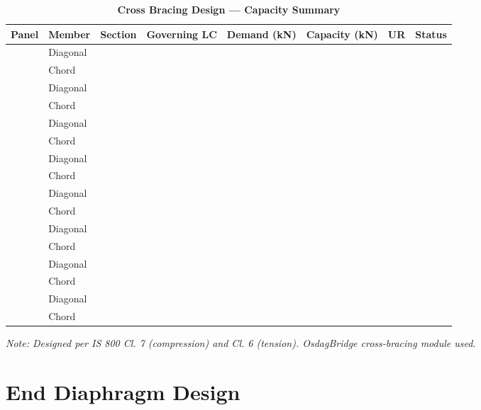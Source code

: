 \documentclass[12pt,a4paper]{report}
\numberwithin{table}{chapter}
\numberwithin{figure}{chapter}
\begin{document}
\vspace{1em}
\begin{longtable}{|C{2.0cm}|L{1.8cm}|C{2.2cm}|C{3.0cm}|C{1.8cm}|C{1.8cm}|C{1.2cm}|C{1.8cm}|}
\caption{\textbf{Cross Bracing Design --- Capacity Summary}}
\hline
\textbf{Panel} & \textbf{Member} & \textbf{Section} & \textbf{Governing LC} & \textbf{Demand (kN)} & \textbf{Capacity (kN)} & \textbf{UR} & \textbf{Status} \\[6pt]
\hline
{} & Diagonal &  &  &  &  &  &  \\[6pt]
 & Chord &  &  &  &  &  &  \\[6pt]
\hline
{} & Diagonal &  &  &  &  &  &  \\[6pt]
 & Chord &  &  &  &  &  &  \\[6pt]
\hline
{} & Diagonal &  &  &  &  &  &  \\[6pt]
 & Chord &  &  &  &  &  &  \\[6pt]
\hline
{} & Diagonal &  &  &  &  &  &  \\[6pt]
 & Chord &  &  &  &  &  &  \\[6pt]
\hline
{} & Diagonal &  &  &  &  &  &  \\[6pt]
 & Chord &  &  &  &  &  &  \\[6pt]
\hline
{} & Diagonal &  &  &  &  &  &  \\[6pt]
 & Chord &  &  &  &  &  &  \\[6pt]
\hline
{} & Diagonal &  &  &  &  &  &  \\[6pt]
 & Chord &  &  &  &  &  &  \\[6pt]
\hline
{} & Diagonal &  &  &  &  &  &  \\[6pt]
 & Chord &  &  &  &  &  &  \\[6pt]
\hline
\end{longtable}
\noindent\textit{Note: Designed per IS 800 Cl. 7 (compression) and Cl. 6 (tension). OsdagBridge cross-bracing module used.}

\section{End Diaphragm Design}
\label{sec:end-diaphragm}
\end{document}

